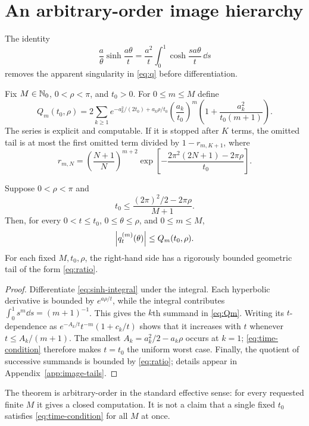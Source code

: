 \section{An arbitrary-order image hierarchy}\label{sec:arbitrary}

The identity
\begin{equation}\label{eq:sinh-integral}
 \frac{a}{\theta}\sinh\frac{a\theta}{t}
 =\frac{a^2}{t}\int_0^1\cosh\frac{sa\theta}{t}\,\dd s
\end{equation}
removes the apparent singularity in \eqref{eq:q} before differentiation.

Fix $M\in\mathbb{N}_0$, $0<\rho<\pi$, and $t_0>0$.  For $0\le m\le M$ define
\begin{equation}\label{eq:Qm}
 Q_m(t_0,\rho)=2\sum_{k\ge1}
 e^{-a_k^2/(2t_0)+a_k\rho/t_0}
 \left(\frac{a_k}{t_0}\right)^m
 \left(1+\frac{a_k^2}{t_0(m+1)}\right).
\end{equation}
The series is explicit and computable.  If it is stopped after $K$ terms,
the omitted tail is at most the first omitted term divided by $1-r_{m,K+1}$,
where
\begin{equation}\label{eq:ratio}
r_{m,N}=\left(\frac{N+1}{N}\right)^{m+2}
\exp\left[-\frac{2\pi^2(2N+1)-2\pi\rho}{t_0}\right].
\end{equation}

\begin{theorem}\label{thm:image-hierarchy}
Suppose $0<\rho<\pi$ and
\begin{equation}\label{eq:time-condition}
 t_0\le \frac{(2\pi)^2/2-2\pi\rho}{M+1}.
\end{equation}
Then, for every $0<t\le t_0$, $0\le\theta\le\rho$, and
$0\le m\le M$,
\begin{equation}\label{eq:qbound}
 \left|q_t^{(m)}(\theta)\right|\le Q_m(t_0,\rho).
\end{equation}
For each fixed $M,t_0,\rho$, the right-hand side has a rigorously bounded geometric
tail of the form \eqref{eq:ratio}.
\end{theorem}

\begin{proof}
Differentiate \eqref{eq:sinh-integral} under the integral.  Each hyperbolic
derivative is bounded by $e^{a\rho/t}$, while the integral contributes
$\int_0^1s^m\dd s=(m+1)^{-1}$.  This gives the $k$th summand in
\eqref{eq:Qm}.  Writing its $t$-dependence as
$e^{-A_k/t}t^{-m}(1+c_k/t)$ shows that it increases with $t$ whenever
$t\le A_k/(m+1)$.  The smallest $A_k=a_k^2/2-a_k\rho$ occurs at $k=1$;
\eqref{eq:time-condition} therefore makes $t=t_0$ the uniform worst case.
Finally, the quotient of successive summands is bounded by
\eqref{eq:ratio}; details appear in Appendix~\ref{app:image-tails}.
\end{proof}

The theorem is arbitrary-order in the standard effective sense: for every
requested finite $M$ it gives a closed computation.  It is not a claim that a
single fixed $t_0$ satisfies \eqref{eq:time-condition} for all $M$ at once.
